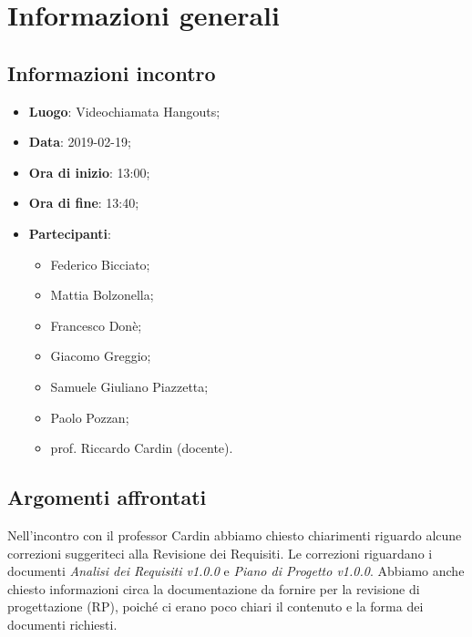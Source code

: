 \section{Informazioni generali}

\subsection{Informazioni incontro}
\begin{itemize}
	\item \textbf{Luogo}: Videochiamata Hangouts;
	\item \textbf{Data}: 2019-02-19;
	\item \textbf{Ora di inizio}: 13:00;
	\item \textbf{Ora di fine}: 13:40;
	\item \textbf{Partecipanti}:
	\begin{itemize}
		\item Federico Bicciato;
		\item Mattia Bolzonella;
		\item Francesco Donè;
		\item Giacomo Greggio;
		\item Samuele Giuliano Piazzetta;
		\item Paolo Pozzan;
		\item prof. Riccardo Cardin (docente).	
	\end{itemize}
\end{itemize}

\subsection{Argomenti affrontati}
Nell'incontro con il professor Cardin abbiamo chiesto chiarimenti riguardo alcune correzioni suggeriteci alla Revisione dei Requisiti. Le correzioni riguardano i documenti \textit{Analisi dei Requisiti v1.0.0} e \textit{Piano di Progetto v1.0.0}.
Abbiamo anche chiesto informazioni circa la documentazione da fornire per la revisione di progettazione (RP), poiché ci erano poco chiari il contenuto e la forma dei documenti richiesti.

